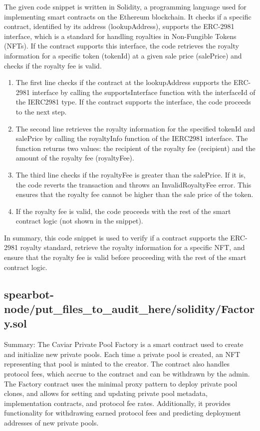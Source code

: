 The given code snippet is written in Solidity, a programming language
used for implementing smart contracts on the Ethereum blockchain. It
checks if a specific contract, identified by its address
(lookupAddress), supports the ERC-2981 interface, which is a standard
for handling royalties in Non-Fungible Tokens (NFTs). If the contract
supports this interface, the code retrieves the royalty information for
a specific token (tokenId) at a given sale price (salePrice) and checks
if the royalty fee is valid.

\begin{enumerate}
\def\labelenumi{\arabic{enumi}.}
\item
  The first line checks if the contract at the lookupAddress supports
  the ERC-2981 interface by calling the supportsInterface function with
  the interfaceId of the IERC2981 type. If the contract supports the
  interface, the code proceeds to the next step.
\item
  The second line retrieves the royalty information for the specified
  tokenId and salePrice by calling the royaltyInfo function of the
  IERC2981 interface. The function returns two values: the recipient of
  the royalty fee (recipient) and the amount of the royalty fee
  (royaltyFee).
\item
  The third line checks if the royaltyFee is greater than the salePrice.
  If it is, the code reverts the transaction and throws an
  InvalidRoyaltyFee error. This ensures that the royalty fee cannot be
  higher than the sale price of the token.
\item
  If the royalty fee is valid, the code proceeds with the rest of the
  smart contract logic (not shown in the snippet).
\end{enumerate}

In summary, this code snippet is used to verify if a contract supports
the ERC-2981 royalty standard, retrieve the royalty information for a
specific NFT, and ensure that the royalty fee is valid before proceeding
with the rest of the smart contract logic.

\hypertarget{spearbot-nodeput_files_to_audit_heresolidityfactorysol}{%
\subsection{spearbot-node/put\_files\_to\_audit\_here/solidity/Factory.sol}\label{spearbot-nodeput_files_to_audit_heresolidityfactorysol}}

Summary: The Caviar Private Pool Factory is a smart contract used to
create and initialize new private pools. Each time a private pool is
created, an NFT representing that pool is minted to the creator. The
contract also handles protocol fees, which accrue to the contract and
can be withdrawn by the admin. The Factory contract uses the minimal
proxy pattern to deploy private pool clones, and allows for setting and
updating private pool metadata, implementation contracts, and protocol
fee rates. Additionally, it provides functionality for withdrawing
earned protocol fees and predicting deployment addresses of new private
pools.

